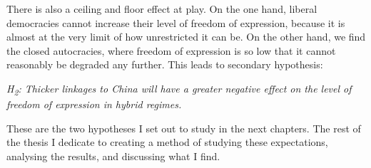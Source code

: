 There is also a ceiling and floor effect at play. On the one hand, liberal democracies cannot increase their level of freedom of expression, because it is almost at the very limit of how unrestricted it can be. On the other hand, we find the closed autocracies, where freedom of expression is so low that it cannot reasonably be degraded any further. This leads to secondary hypothesis:
\begin{displayquote}
    \textit{H\textsubscript{2}: Thicker linkages to China will have a greater negative effect on the level of freedom of expression in hybrid regimes.}
\end{displayquote}

These are the two hypotheses I set out to study in the next chapters. The rest of the thesis I dedicate to creating a method of studying these expectations, analysing the results, and discussing what I find. 